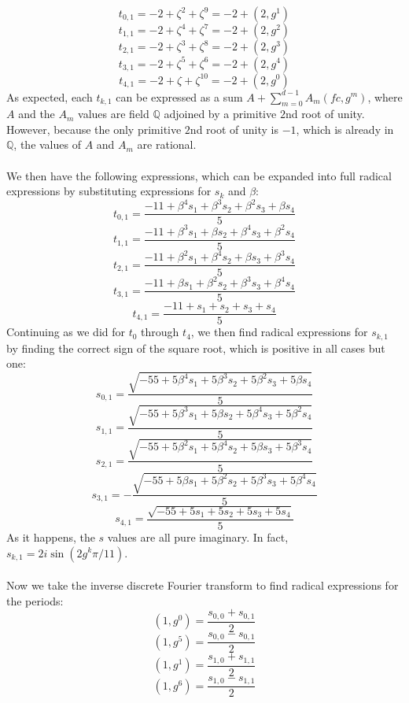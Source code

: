 \documentclass{article}
\begin{document}
        $$ t_{0, 1} = -2 + \zeta^2 + \zeta^9 = -2 + (2, g^1) $$
        $$ t_{1, 1} = -2 + \zeta^4 + \zeta^7 = -2 + (2, g^2) $$
        $$ t_{2, 1} = -2 + \zeta^3 + \zeta^8 = -2 + (2, g^3) $$
        $$ t_{3, 1} = -2 + \zeta^5 + \zeta^6 = -2 + (2, g^4) $$
        $$ t_{4, 1} = -2 + \zeta + \zeta^{10} = -2 + (2, g^0) $$
        As expected, each $ t_{k, 1} $ can be expressed as a sum $ A + \sum_{m = 0}^{d - 1} A_m (fc, g^m) $, where $ A $ and the $ A_m $ values are field $ \mathbb{Q} $ adjoined by a primitive $ 2 $nd root of unity. However, because the only primitive $ 2 $nd root of unity is $ -1 $, which is already in $ \mathbb{Q} $, the values of $ A $ and $ A_m $ are rational.\\
        \\
        We then have the following expressions, which can be expanded into full radical expressions by substituting expressions for $ s_k $ and $ \beta $:
        $$ t_{0, 1} = \frac{-11 + \beta^4 s_1 + \beta^3 s_2 + \beta^2 s_3 + \beta s_4}{5} $$
        $$ t_{1, 1} = \frac{-11 + \beta^3 s_1 + \beta s_2 + \beta^4 s_3 + \beta^2 s_4}{5} $$
        $$ t_{2, 1} = \frac{-11 + \beta^2 s_1 + \beta^4 s_2 + \beta s_3 + \beta^3 s_4}{5} $$
        $$ t_{3, 1} = \frac{-11 + \beta s_1 + \beta^2 s_2 + \beta^3 s_3 + \beta^4 s_4}{5} $$
        $$ t_{4, 1} = \frac{-11 + s_1 + s_2 + s_3 + s_4}{5} $$
        Continuing as we did for $ t_0 $ through $ t_4 $, we then find radical expressions for $ s_{k, 1} $ by finding the correct sign of the square root, which is positive in all cases but one:
        $$ s_{0, 1} = \frac{\sqrt{-55 + 5 \beta^4 s_1 + 5 \beta^3 s_2 + 5 \beta^2 s_3 + 5 \beta s_4}}{5} $$
        $$ s_{1, 1} = \frac{\sqrt{-55 + 5 \beta^3 s_1 + 5 \beta s_2 + 5 \beta^4 s_3 + 5 \beta^2 s_4}}{5} $$
        $$ s_{2, 1} = \frac{\sqrt{-55 + 5 \beta^2 s_1 + 5 \beta^4 s_2 + 5 \beta s_3 + 5 \beta^3 s_4}}{5} $$
        $$ s_{3, 1} = -\frac{\sqrt{-55 + 5 \beta s_1 + 5 \beta^2 s_2 + 5 \beta^3 s_3 + 5 \beta^4 s_4}}{5} $$
        $$ s_{4, 1} = \frac{\sqrt{-55 + 5s_1 + 5s_2 + 5s_3 + 5s_4}}{5} $$
        As it happens, the $ s $ values are all pure imaginary. In fact, $ s_{k, 1} = 2i \sin(2g^k \pi /11) $.\\
        \\
        Now we take the inverse discrete Fourier transform to find radical expressions for the periods:
        $$ (1, g^0) = \frac{s_{0, 0} + s_{0, 1}}{2} $$
        $$ (1, g^5) = \frac{s_{0, 0} - s_{0, 1}}{2} $$
        $$ (1, g^1) = \frac{s_{1, 0} + s_{1, 1}}{2} $$
        $$ (1, g^6) = \frac{s_{1, 0} - s_{1, 1}}{2} $$
\end{document}
